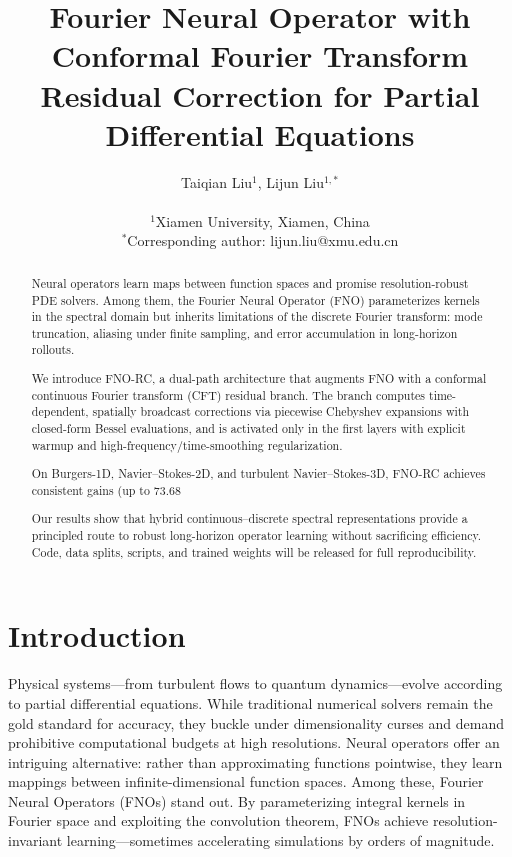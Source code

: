 \documentclass[11pt]{article}
\title{\textbf{Fourier Neural Operator with Conformal Fourier Transform Residual Correction for Partial Differential Equations}}
\author{
    Taiqian Liu$^{1}$, Lijun Liu$^{1,*}$ \\
    \\
    $^{1}$Xiamen University, Xiamen, China \\
    $^{*}$Corresponding author: lijun.liu@xmu.edu.cn
}
\date{}
\begin{document}
\maketitle

\begin{abstract}
Neural operators learn maps between function spaces and promise resolution-robust PDE solvers. Among them, the Fourier Neural Operator (FNO) parameterizes kernels in the spectral domain but inherits limitations of the discrete Fourier transform: mode truncation, aliasing under finite sampling, and error accumulation in long-horizon rollouts.

We introduce FNO-RC, a dual-path architecture that augments FNO with a conformal continuous Fourier transform (CFT) residual branch. The branch computes time-dependent, spatially broadcast corrections via piecewise Chebyshev expansions with closed-form Bessel evaluations, and is activated only in the first layers with explicit warmup and high-frequency/time-smoothing regularization.

On Burgers-1D, Navier–Stokes-2D, and turbulent Navier–Stokes-3D, FNO-RC achieves consistent gains (up to 73.68%

Our results show that hybrid continuous–discrete spectral representations provide a principled route to robust long-horizon operator learning without sacrificing efficiency. Code, data splits, scripts, and trained weights will be released for full reproducibility.
\end{abstract}

\section{Introduction}

Physical systems—from turbulent flows to quantum dynamics—evolve according to partial differential equations. While traditional numerical solvers remain the gold standard for accuracy, they buckle under dimensionality curses and demand prohibitive computational budgets at high resolutions. Neural operators \citep{kovachki2021neural,lu2021learning} offer an intriguing alternative: rather than approximating functions pointwise, they learn mappings between infinite-dimensional function spaces. Among these, Fourier Neural Operators (FNOs) \citep{Li2020FNO} stand out. By parameterizing integral kernels in Fourier space and exploiting the convolution theorem, FNOs achieve resolution-invariant learning—sometimes accelerating simulations by orders of magnitude.
\end{document}
